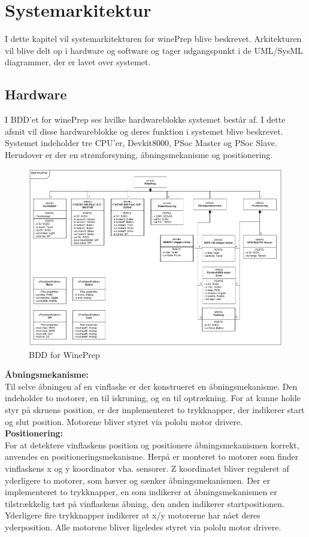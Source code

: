 \chapter{Systemarkitektur}
I dette kapitel vil systemarkitekturen for winePrep blive beskrevet. Arkitekturen vil blive delt op i hardware og software og tager udgangspunkt 
i de UML/SysML diagrammer, der er lavet over systemet. 

\section{Hardware}
I BDD'et for winePrep ses hvilke hardwareblokke systemet består af. I dette afsnit vil disse hardwareblokke og deres funktion i systemet blive beskrevet.
Systemet indeholder tre CPU'er, Devkit8000, PSoc Master og PSoc Slave. Herudover er der en strømforsyning, åbningsmekanisme og positionering.\\

\begin{figure}[H]
\includegraphics[scale=0.33]{tex/Arkitektur/Fotos/HW/BDD_winePrep}
\caption{BDD for WinePrep}
\end{figure}

\textbf{Åbningsmekanisme:}\\
Til selve åbningen af en vinflaske er der konstrueret en åbningsmekanisme. Den indeholder to motorer, en til iskruning, og en til optrækning.
For at kunne holde styr på skruens position, er der implementeret to trykknapper, der indikerer start og slut position. Motorene bliver styret via 
pololu motor drivere.\\   

\textbf{Positionering:}\\
For at detektere vinflaskens position og positionere åbningsmekanismen korrekt, anvendes en positioneringsmekanisme. Herpå er monteret to motorer som finder
vinflaskens x og y koordinator vha. sensorer. Z koordinatet bliver reguleret af yderligere to motorer, som hæver og sænker åbningsmekanismen. 
Der er implementeret to trykknapper, en som indikerer at åbningsmekanismen er tilstrækkelig tæt på vinflaskens åbning, den anden indikerer startpositionen. 
Yderligere fire trykknapper indikerer at x/y motorerne har nået deres yderposition. Alle motorene bliver ligeledes styret via pololu motor drivere.\\        
      
